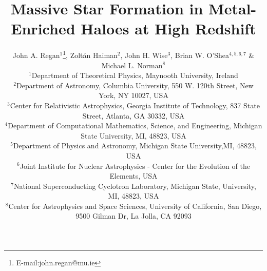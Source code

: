 \documentclass[graphics, twocolumn, usenatbib]{mn2e}
\begin{document}
\title{Massive Star Formation in Metal-Enriched Haloes at High Redshift}
\author[J. A. Regan, Z. Haiman, J. H. Wise, B.W. O'Shea \&  M.L. Norman]{John A. Regan$^{1}$\thanks{E-mail:john.regan@mu.ie}, Zolt\'an Haiman$^{2}$,
  John H. Wise$^{3}$, Brian W. O'Shea$^{4,5,6,7}$ \newauthor \& Michael L. Norman$^8$\\
  $^1$Department of Theoretical Physics, Maynooth University, Ireland\\
  $^2$Department of Astronomy, Columbia University, 550 W. 120th Street, New York, NY 10027, USA\\
  $^3$Center for Relativistic Astrophysics, Georgia Institute of Technology, 837 State Street, Atlanta, GA 30332, USA\\
  $^4$Department of Computational Mathematics, Science, and Engineering, Michigan State University, MI, 48823, USA\\    
  $^5$Department of Physics and Astronomy, Michigan State University,MI, 48823, USA\\
  $^6$Joint Institute for Nuclear Astrophysics - Center for the Evolution of the Elements, USA\\
  $^7$National Superconducting Cyclotron Laboratory, Michigan State, University, MI, 48823, USA\\
  $^8$Center for Astrophysics and Space Sciences, University of California, San Diego, 9500 Gilman Dr, La Jolla, CA 92093\\}

\label{firstpage}
\pagerange{\pageref{firstpage}--\pageref{lastpage}}
\maketitle
\end{document}
